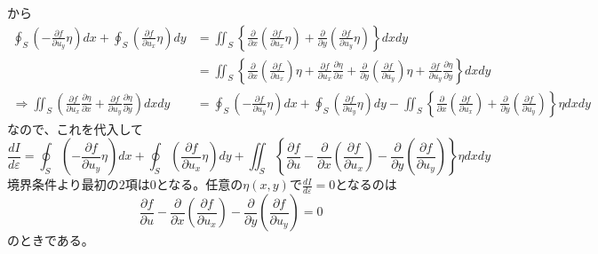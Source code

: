 \documentclass{jsarticle}
\begin{document}
から
\begin{align*}
\oint_{S}\left(-\frac{\partial f}{\partial u_{y}}\eta\right)dx+\oint_{S}\left(\frac{\partial f}{\partial u_{x}}\eta\right)dy&=\iint_{S}\left\{\frac{\partial}{\partial x}\left(\frac{\partial f}{\partial u_{x}}\eta\right)+\frac{\partial}{\partial y}\left(\frac{\partial f}{\partial u_{y}}\eta\right)\right\}dxdy\\
&=\iint_{S}\left\{\frac{\partial}{\partial x}\left(\frac{\partial f}{\partial u_{x}}\right)\eta+\frac{\partial f}{\partial u_{x}}\frac{\partial\eta}{\partial x}+\frac{\partial}{\partial y}\left(\frac{\partial f}{\partial u_{y}}\right)\eta+\frac{\partial f}{\partial u_{y}}\frac{\partial\eta}{\partial y}\right\}dxdy\\
\Longrightarrow\iint_{S}\left(\frac{\partial f}{\partial u_{x}}\frac{\partial\eta}{\partial x}+\frac{\partial f}{\partial u_{y}}\frac{\partial\eta}{\partial y}\right)dxdy&=\oint_{S}\left(-\frac{\partial f}{\partial u_{y}}\eta\right)dx+\oint_{S}\left(\frac{\partial f}{\partial u_{y}}\eta\right)dy-\iint_{S}\left\{\frac{\partial}{\partial x}\left(\frac{\partial f}{\partial u_{x}}\right)+\frac{\partial}{\partial y}\left(\frac{\partial f}{\partial u_{y}}\right)\right\}\eta dxdy
\end{align*}
なので、これを代入して
\[\frac{dI}{d\varepsilon}=\oint_{S}\left(-\frac{\partial f}{\partial u_{y}}\eta\right)dx+\oint_{S}\left(\frac{\partial f}{\partial u_{x}}\eta\right)dy+\iint_{S}\left\{\frac{\partial f}{\partial u}-\frac{\partial}{\partial x}\left(\frac{\partial f}{\partial u_{x}}\right)-\frac{\partial}{\partial y}\left(\frac{\partial f}{\partial u_{y}}\right)\right\}\eta dxdy\]
境界条件より最初の\(2\)項は\(0\)となる。任意の\(\eta(x,y)\)で\(\frac{dI}{d\varepsilon}=0\)となるのは
\[\frac{\partial f}{\partial u}-\frac{\partial}{\partial x}\left(\frac{\partial f}{\partial u_{x}}\right)-\frac{\partial}{\partial y}\left(\frac{\partial f}{\partial u_{y}}\right)=0\]
のときである。\\
\\
\end{document}
